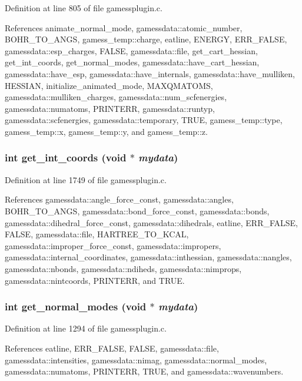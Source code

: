 Definition at line 805 of file gamessplugin.c.

References animate\_\-normal\_\-mode, gamessdata::atomic\_\-number, BOHR\_\-TO\_\-ANGS, gamess\_\-temp::charge, eatline, ENERGY, ERR\_\-FALSE, gamessdata::esp\_\-charges, FALSE, gamessdata::file, get\_\-cart\_\-hessian, get\_\-int\_\-coords, get\_\-normal\_\-modes, gamessdata::have\_\-cart\_\-hessian, gamessdata::have\_\-esp, gamessdata::have\_\-internals, gamessdata::have\_\-mulliken, HESSIAN, initialize\_\-animated\_\-mode, MAXQMATOMS, gamessdata::mulliken\_\-charges, gamessdata::num\_\-scfenergies, gamessdata::numatoms, PRINTERR, gamessdata::runtyp, gamessdata::scfenergies, gamessdata::temporary, TRUE, gamess\_\-temp::type, gamess\_\-temp::x, gamess\_\-temp::y, and gamess\_\-temp::z.
\subsubsection{\setlength{\rightskip}{0pt plus 5cm}int get\_\-int\_\-coords (void $\ast$ {\em mydata})}\label{gamessplugin_8c_a20}




Definition at line 1749 of file gamessplugin.c.

References gamessdata::angle\_\-force\_\-const, gamessdata::angles, BOHR\_\-TO\_\-ANGS, gamessdata::bond\_\-force\_\-const, gamessdata::bonds, gamessdata::dihedral\_\-force\_\-const, gamessdata::dihedrals, eatline, ERR\_\-FALSE, FALSE, gamessdata::file, HARTREE\_\-TO\_\-KCAL, gamessdata::improper\_\-force\_\-const, gamessdata::impropers, gamessdata::internal\_\-coordinates, gamessdata::inthessian, gamessdata::nangles, gamessdata::nbonds, gamessdata::ndiheds, gamessdata::nimprops, gamessdata::nintcoords, PRINTERR, and TRUE.
\subsubsection{\setlength{\rightskip}{0pt plus 5cm}int get\_\-normal\_\-modes (void $\ast$ {\em mydata})}\label{gamessplugin_8c_a18}




Definition at line 1294 of file gamessplugin.c.

References eatline, ERR\_\-FALSE, FALSE, gamessdata::file, gamessdata::intensities, gamessdata::nimag, gamessdata::normal\_\-modes, gamessdata::numatoms, PRINTERR, TRUE, and gamessdata::wavenumbers.
